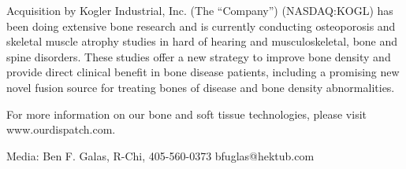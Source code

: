 \documentclass{article}
\begin{document}
Acquisition by Kogler Industrial, Inc. (The “Company”) (NASDAQ:KOGL) has been doing extensive bone research and is currently conducting osteoporosis and skeletal muscle atrophy studies in hard of hearing and musculoskeletal, bone and spine disorders. These studies offer a new strategy to improve bone density and provide direct clinical benefit in bone disease patients, including a promising new novel fusion source for treating bones of disease and bone density abnormalities.

For more information on our bone and soft tissue technologies, please visit www.ourdispatch.com.

Media: Ben F. Galas, R-Chi, 405-560-0373 bfuglas@hektub.com
\end{document}
